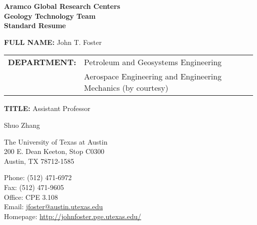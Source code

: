 \documentclass[12pt,letterpaper]{article}
\makeatletter
\let\saved@bibitem\@bibitem %
\def\HCode#1{}
\def\name{Shuo Zhang}
\makeatother
\begin{document}
\sloppy

\begingroup
\makeatletter
\let\@bibitem\saved@bibitem %
\endgroup

\ifdefined\iscockrell
\begin{center}
    \textbf{Aramco Global Research Centers \\ Geology Technology Team \\ Standard Resume}
\end{center}

\bigskip

\begin{minipage}[t]{0.7\textwidth}
    \textbf{\large FULL NAME:} John T. Foster \\

    \begin{tabular}{@{}ll}
        \textbf{\large DEPARTMENT:} & Petroleum and Geosystems Engineering \\
        & Aerospace Engineering and Engineering Mechanics (by courtesy)
    \end{tabular}
\end{minipage}
\begin{minipage}[t]{0.3\textwidth}
    \textbf{\large TITLE:} Assistant Professor
\end{minipage}
\else
\HCode{<div class="fluid-container"}

\HCode{<div class="row">}
\HCode{<div class="col-md-12">}
\HCode{<h1>}
{\huge \name}
\HCode{</h1>}
\HCode{</div>} %
\HCode{</div>} %

\bigskip

\HCode{<div class="row">}
\HCode{<div class="col-md-4">}
\begin{minipage}[t]{0.5\textwidth}
  The University of Texas at Austin \\
  200 E. Dean Keeton, Stop C0300 \\
  Austin, TX 78712-1585 \\
\end{minipage}
\HCode{</div>} %
\HCode{<div class="col-md-8">}
\begin{minipage}[t]{0.5\textwidth}
  Phone: (512) 471-6972 \\
  Fax: (512) 471-9605 \\
  Office: CPE 3.108 \\
\ifdefined\ispdf
  Email: \href{mailto:jfoster@austin.utexas.edu}{jfoster@austin.utexas.edu} \\
\fi
  Homepage: \href{http://johnfoster.pge.utexas.edu/}{http://johnfoster.pge.utexas.edu/}
\end{minipage}
\HCode{</div>} %
\HCode{</div>} %
\end{document}
